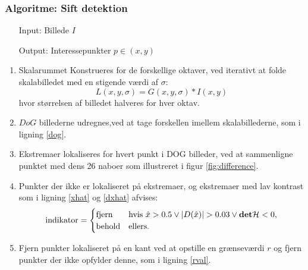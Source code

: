 \subsubsection{Algoritme: Sift detektion}
\begin{enumerate}
\item[Input:] Billede $I$
\item[Output:] Interessepunkter $p \in (x,y)$
\end{enumerate}
\begin{enumerate}
\item{Skalarummet Konstrueres for de forskellige oktaver, ved iterativt at folde skalabilledet med en stigende værdi af $\sigma$: $$ L(x,y,\sigma)= G(x,y,\sigma) \ast I(x,y) $$
hvor størrelsen af billedet halveres for hver oktav.}
\item{$DoG$ billederne udregnes,ved at tage forskellen imellem skalabillederne, som i ligning \eqref{dog}.}
\item{Ekstremaer lokaliseres for hvert punkt i DOG billeder, ved at sammenligne punktet med dens 26 naboer som illustreret i figur \ref{fig:difference}.}
\item{Punkter der ikke er lokaliseret på ekstremaer, og ekstremaer med lav kontrast som i ligning \eqref{xhat} og \eqref{dxhat} afvises:
\begin{equation}
\begin{split}
\text{indikator} = 
\begin{cases}
\text{fjern}& \text{hvis } \hat{x}>0.5 \lor |D(\hat{x})|>0.03 \lor \bold{det} \mathcal{H}<0 , \\
\text{behold}& \text{ellers}. 
\end{cases}
\end{split}
\label{maxsurp}
\end{equation}
}
\item{Fjern punkter lokaliseret på en kant ved at opstille en grænseværdi $r$ og fjern punkter der ikke opfylder denne, som i ligning \eqref{rval}.}
\end{enumerate}